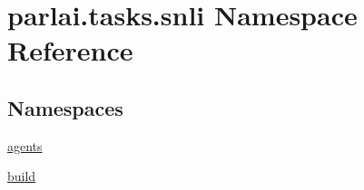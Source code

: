 \hypertarget{namespaceparlai_1_1tasks_1_1snli}{}\section{parlai.\+tasks.\+snli Namespace Reference}
\label{namespaceparlai_1_1tasks_1_1snli}
\subsection*{Namespaces}
\begin{DoxyCompactItemize}
\item 
 \hyperlink{namespaceparlai_1_1tasks_1_1snli_1_1agents}{agents}
\item 
 \hyperlink{namespaceparlai_1_1tasks_1_1snli_1_1build}{build}
\end{DoxyCompactItemize}
